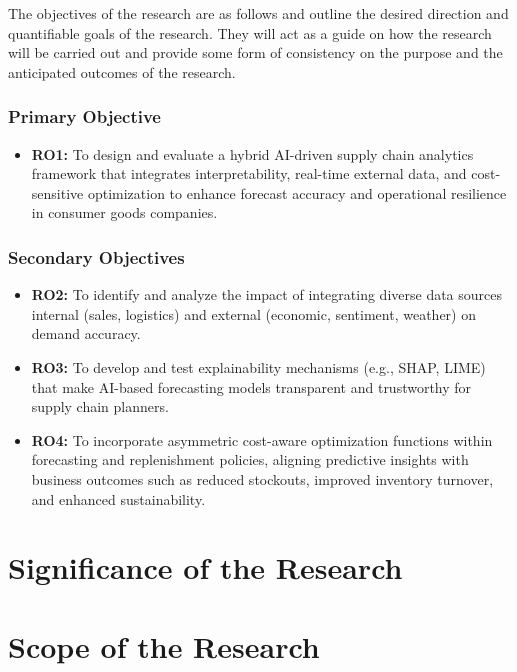 The objectives of the research are as follows and outline the desired direction and quantifiable goals of the research. They will act as a guide on how the research will be carried out and provide some form of consistency on the purpose and the anticipated outcomes of the research.

\subsubsection{Primary Objective}

\begin{itemize}
    \item \textbf{RO1:} To design and evaluate a hybrid AI-driven supply chain analytics framework that integrates interpretability, real-time external data, and cost-sensitive optimization to enhance forecast accuracy and operational resilience in consumer goods companies.
\end{itemize}

\subsubsection{Secondary Objectives}

\begin{itemize}
    \item \textbf{RO2:} To identify and analyze the impact of integrating diverse data sources internal (sales, logistics) and external (economic, sentiment, weather) on demand accuracy. 
    \item \textbf{RO3:} To develop and test explainability mechanisms (e.g., SHAP, LIME) that make AI-based forecasting models transparent and trustworthy for supply chain planners.
    \item \textbf{RO4:} To incorporate asymmetric cost-aware optimization functions within forecasting and replenishment policies, aligning predictive insights with business outcomes such as reduced stockouts, improved inventory turnover, and enhanced sustainability.
\end{itemize}

\section{Significance of the Research}


\section{Scope of the Research}